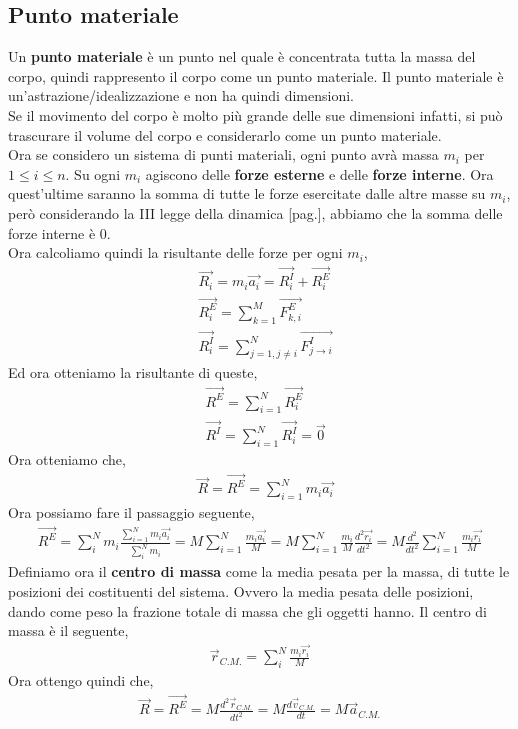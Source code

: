     \subsection{Punto materiale}
        Un \textbf{punto materiale} è un punto nel quale è concentrata tutta la massa del corpo, quindi rappresento il corpo come un punto materiale. Il punto materiale è un'astrazione/idealizzazione e non ha quindi dimensioni.\\
        Se il movimento del corpo è molto più grande delle sue dimensioni infatti, si può trascurare il volume del corpo e considerarlo come un punto materiale.\\
        Ora se considero un sistema di punti materiali, ogni punto avrà massa $m_i$ per $1\leq i\leq n$. Su ogni $m_i$ agiscono delle \textbf{forze esterne} e delle \textbf{forze interne}. Ora quest'ultime saranno la somma di tutte le forze esercitate dalle altre masse su $m_i$, però considerando la III legge della dinamica [pag.\pageref{IIILeggeDinamica}], abbiamo che la somma delle forze interne è $0$.\\
        Ora calcoliamo quindi la risultante delle forze per ogni $m_i$,
        \begin{align*}
            &\vec{R_i}=m_i\vec{a_i}=\vec{R_i^I} + \vec{R_i^E}\\
            &\vec{R_i^E}=\sum_{k=1}^M \vec{F_{k,i}^E}\\
            &\vec{R_i^I}=\sum_{j=1,j\neq i}^N \vec{F_{j\rightarrow i}^I}
        \end{align*}
        Ed ora otteniamo la risultante di queste,
        \begin{align*}
            &\vec{R^E}=\sum_{i=1}^N \vec{R_i^E}\\
            &\vec{R^I}=\sum_{i=1}^N \vec{R_i^I}=\vec{0}
        \end{align*}
        Ora otteniamo che,
        \begin{align*}
            &\vec{R}=\vec{R^E}=\sum_{i=1}^N m_i\vec{a_i}
        \end{align*}
        Ora possiamo fare il passaggio seguente,
        \begin{align*}
            \vec{R^E}=\sum_i^N m_i \frac{\sum_{i=1}^N m_i\vec{a_i}}{\sum_i^N m_i}=M \sum_{i=1}^N \frac{m_i\vec{a_i}}{M}=M \sum_{i=1}^N \frac{m_i}{M}\frac{d^2\vec{r_i}}{dt^2} = M \frac{d^2}{dt^2}\sum_{i=1}^N\frac{m_i\vec{r_i}}{M}
        \end{align*}
        Definiamo ora il \textbf{centro di massa} come la media pesata per la massa, di tutte le posizioni dei costituenti del sistema. Ovvero la media pesata delle posizioni, dando come peso la frazione totale di massa che gli oggetti hanno. Il centro di massa è il seguente,
        \begin{align*}
            \vec{r}_{C.M.}=\sum_i^N \frac{m_i\vec{r_i}}{M}
        \end{align*}
        Ora ottengo quindi che,
        \begin{align*}
            \vec{R}=\vec{R^E}=M\frac{d^2\vec{r}_{C.M.}}{dt^2}=M\frac{d\vec{v}_{C.M.}}{dt}=M\vec{a}_{C.M.}
        \end{align*}

